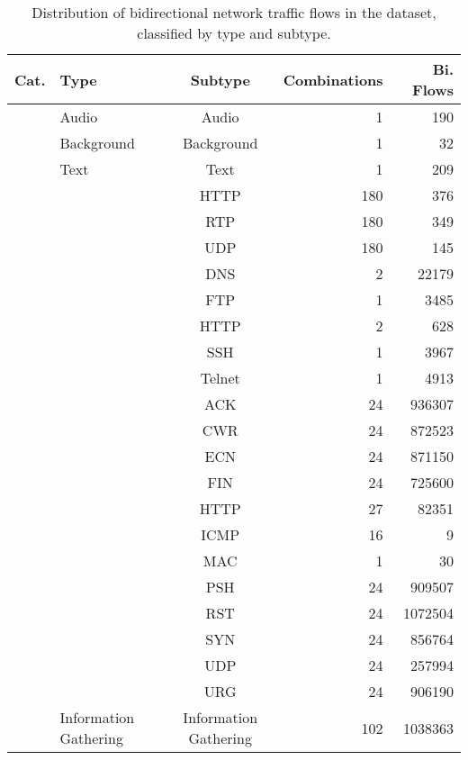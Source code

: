 \documentclass[lettersize,journal]{IEEEtran}
\begin{document}
\begin{table}
    \centering
    \caption{Distribution of bidirectional network traffic flows in the dataset, classified by type and subtype.}\label{tab:dataset_statistics}
    \setlength{\leftmargini}{0.3cm}    
    \begin{tabularx}{\columnwidth}{@{}>{\hsize=0.5cm}X>{\hsize=1.3cm}XC>{\hsize=0.3cm}RR@{}} 
        \toprule
        \textbf{Cat.} & \textbf{Type} & \textbf{Subtype} & \textbf{Combinations} & \textbf{Bi. Flows} \\
        \midrule
         & Audio & Audio & 1 & 190 \\
         & Background & Background & 1 & 32 \\
         & Text & Text & 1 & 209 \\
         &  & HTTP & 180 & 376 \\
        & & RTP & 180 & 349 \\
        & & UDP & 180 & 145 \\
        \midrule
         &  & \ac{DNS} & 2 & 22179 \\
        & & FTP & 1 & 3485 \\
        & & HTTP & 2 & 628 \\
        & & SSH & 1 & 3967 \\
        & & Telnet & 1 & 4913 \\
        &  & ACK & 24 & 936307 \\
        & & CWR & 24  & 872523 \\
        & & ECN & 24 & 871150 \\
        & & FIN & 24 & 725600 \\
        & & HTTP & 27 & 82351 \\
        & & \ac{ICMP} & 16 & 9 \\
        & & MAC & 1 & 30 \\
        & & PSH & 24 & 909507 \\
        & & RST & 24 & 1072504 \\
        & & SYN & 24 & 856764 \\
        & & UDP & 24 & 257994 \\
        & & URG & 24 & 906190 \\
        & Information Gathering & Information Gathering & 102 & 1038363 \\

\end{tabularx}
\end{table}
\end{document}
